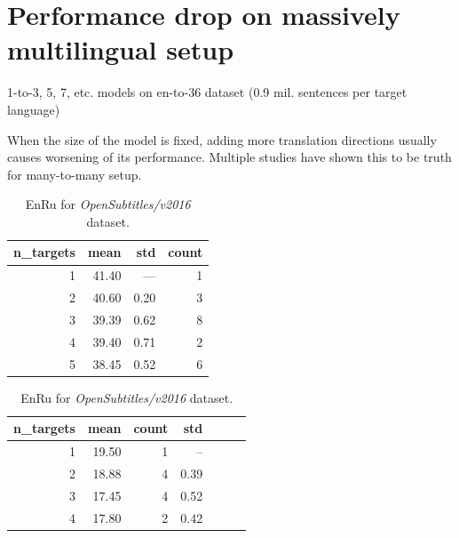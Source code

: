 \section{Performance drop on massively multilingual setup}
1-to-3, 5, 7, etc. models on en-to-36 dataset (0.9 mil. sentences per target language)

When the size of the model is fixed, adding more translation directions usually causes
worsening of its performance. Multiple studies have shown this to be truth for
many-to-many setup.



\begin{table}[h!]
\begin{subtable}[t]{0.45\linewidth}
	\centering
	\begin{tabular}{rrrr}
	\toprule
	n\_targets &   mean &   std & count \\
	\midrule
	         1 &  41.40 &  ---  &   1 \\
	         2 &  40.60 &  0.20 &   3 \\
	         3 &  39.39 &  0.62 &   8 \\
	         4 &  39.40 &  0.71 &   2 \\
	         5 &  38.45 &  0.52 &   6 \\
	\bottomrule
	\end{tabular}

	\caption{
		En\to{}Bg for \emph{Europarl/v7} dataset.
		}
	\label{tab:bg/Europarl/v7}
\end{subtable}
\begin{subtable}[t]{0.45\linewidth}
	\centering
	\begin{tabular}{rrrrrrr}
	\toprule
	n\_targets & mean & count & std \\
	\midrule
	        1 &     19.50 &    1 &   --  \\
	        2 &     18.88 &    4 &  0.39 \\
	        3 &     17.45 &    4 &  0.52 \\
	        4 &     17.80 &    2 &  0.42 \\
	\bottomrule
	\end{tabular}
	
	\caption{
		En\to{}Ru for \emph{OpenSubtitles/v2016} dataset.
		}
	\label{ table:ru/OpenSubtitles/v2016 }
\end{subtable}
\end{table}



